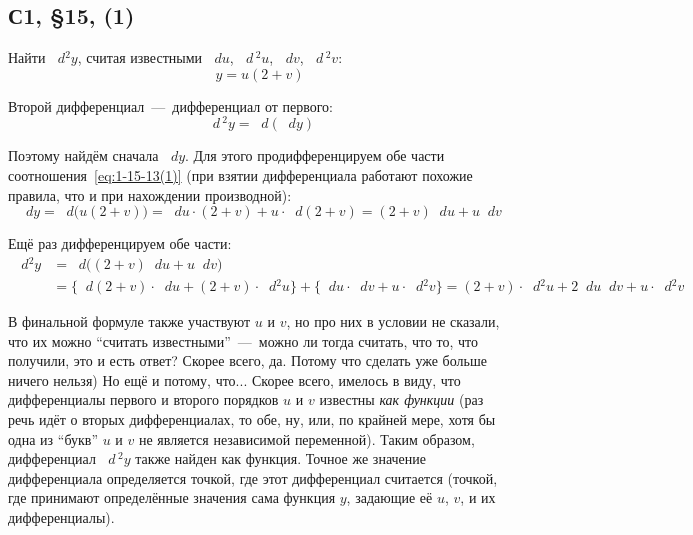 \documentclass[a4paper,12pt]{article}
\newcommand{\diff}{\mathop{}\!d\!}
\begin{document}
  
  \subsection{С1, \S 15, (1)}

  Найти $\diff^2 y$, считая известными $\diff u$, $\diff\,^2 u$, $\diff v$, $\diff\,^2 v$:
  \begin{equation}\label{eq:1-15-13(1)}
    y = u(2 + v)
  \end{equation}
  
  \begin{solution}
    Второй дифференциал~---~дифференциал от первого:
    \[
      \diff\,^2 y = \diff (\diff y)
    \]

    Поэтому найдём сначала $\diff y$.
    Для этого продифференцируем обе части соотношения~\eqref{eq:1-15-13(1)} (при взятии дифференциала работают похожие правила, что и при нахождении производной):
    \[
      \diff y = \diff \bigl(u (2 + v)\bigr)
        = \diff u \cdot (2 + v) + u \cdot \diff (2 + v)
        = (2 + v) \diff u + u \diff v
    \]

    Ещё раз дифференцируем обе части:
    \begin{equation*}
    \begin{split}
      \diff^2 y &= \diff \bigl((2 + v) \diff u + u \diff v\bigr)\\
        &= \bigl\{\diff (2 + v) \cdot \diff u + (2 + v) \cdot \diff^2 u\bigr\} + \bigl\{\diff u \cdot \diff v + u \cdot \diff^2 v\bigr\}
        = (2 + v) \cdot \diff^2 u + 2 \diff u \diff v + u \cdot \diff^2 v
    \end{split}
    \end{equation*}

    \begin{remark}
      В финальной формуле также участвуют $u$ и $v$, но про них в условии не сказали, что их можно ``считать известными''~---~можно ли тогда считать, что то, что получили, это и есть ответ?
      Скорее всего, да.
      Потому что сделать уже больше ничего нельзя)
      Но ещё и потому, что...
      Скорее всего, имелось в виду, что дифференциалы первого и второго порядков $u$ и $v$ известны \emph{как функции} (раз речь идёт о вторых дифференциалах, то обе, ну, или, по крайней мере, хотя бы одна из ``букв'' $u$ и $v$ не является независимой переменной).
      Таким образом, дифференциал $\diff\,^2 y$ также найден как функция.
      Точное же значение дифференциала определяется точкой, где этот дифференциал считается (точкой, где принимают определённые значения сама функция $y$, задающие её $u$, $v$, и их дифференциалы).
    \end{remark}
  \end{solution}
\end{document}
